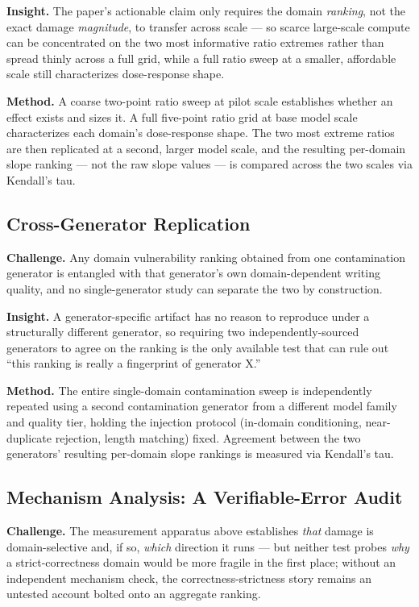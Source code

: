 \documentclass[11pt]{article}
\begin{document}
\textbf{Insight.} The paper's actionable claim only requires the domain \emph{ranking}, not the exact damage \emph{magnitude}, to transfer across scale --- so scarce large-scale compute can be concentrated on the two most informative ratio extremes rather than spread thinly across a full grid, while a full ratio sweep at a smaller, affordable scale still characterizes dose-response shape.

\textbf{Method.} A coarse two-point ratio sweep at pilot scale establishes whether an effect exists and sizes it. A full five-point ratio grid at base model scale characterizes each domain's dose-response shape. The two most extreme ratios are then replicated at a second, larger model scale, and the resulting per-domain slope ranking --- not the raw slope values --- is compared across the two scales via Kendall's tau.

\subsection{Cross-Generator Replication}
\textbf{Challenge.} Any domain vulnerability ranking obtained from one contamination generator is entangled with that generator's own domain-dependent writing quality, and no single-generator study can separate the two by construction.

\textbf{Insight.} A generator-specific artifact has no reason to reproduce under a structurally different generator, so requiring two independently-sourced generators to agree on the ranking is the only available test that can rule out ``this ranking is really a fingerprint of generator X.''

\textbf{Method.} The entire single-domain contamination sweep is independently repeated using a second contamination generator from a different model family and quality tier, holding the injection protocol (in-domain conditioning, near-duplicate rejection, length matching) fixed. Agreement between the two generators' resulting per-domain slope rankings is measured via Kendall's tau.

\subsection{Mechanism Analysis: A Verifiable-Error Audit}
\textbf{Challenge.} The measurement apparatus above establishes \emph{that} damage is domain-selective and, if so, \emph{which} direction it runs --- but neither test probes \emph{why} a strict-correctness domain would be more fragile in the first place; without an independent mechanism check, the correctness-strictness story remains an untested account bolted onto an aggregate ranking.
\end{document}
